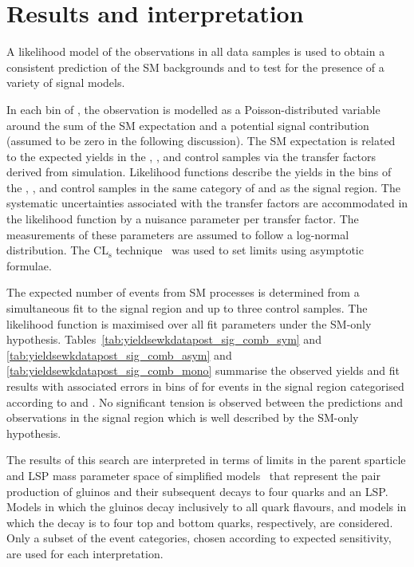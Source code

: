 \section{Results and interpretation}
\label{sec:interpretation}

A likelihood model of the observations in all data samples is
used to obtain a consistent prediction of the SM backgrounds and to
test for the presence of a variety of signal models.

In each bin of \scalht, the observation is modelled as a
Poisson-distributed variable around the sum of the SM expectation and a
potential signal contribution (assumed to be zero in the following
discussion). The SM expectation is related to the expected yields in
the \mj, \mmj, and \gj control samples via the transfer factors
derived from simulation. Likelihood functions describe the yields in the \scalht bins
of the \mj, \mmj, and \gj control samples in the same category of
\njet and \nb as the signal region. The systematic uncertainties
associated with the transfer factors are accommodated in the
likelihood function by a nuisance parameter per transfer factor. The
measurements of these parameters are assumed to follow a log-normal
distribution. The CL$_{\mathrm{s}}$ technique~\cite{read, Cowan:2010js} was used to set limits using asymptotic formulae.

The expected number of events from SM processes is determined from a
simultaneous fit to the signal region and up to three control
samples. The likelihood function is maximised over all fit parameters
under the SM-only hypothesis.
Tables~\ref{tab:yieldsewkdatapost_sig_comb_sym} and \ref{tab:yieldsewkdatapost_sig_comb_asym} and
\ref{tab:yieldsewkdatapost_sig_comb_mono} summarise
the observed yields and fit results with associated errors in bins of \scalht for events in the signal region
categorised according to \njet and \nb. 
No significant tension is observed between the predictions and observations in the
signal region which is well described by the SM-only hypothesis.




\clearpage


The results of this search are interpreted in terms of limits in the
parent sparticle and LSP mass parameter space of simplified
models~\cite{Alwall:2008ag, Alwall:2008va, sms} that represent the pair production of gluinos and their subsequent decays to four quarks 
and an LSP. Models in which the gluinos decay inclusively to all quark flavours, and models in which the decay is to four top and bottom quarks, respectively, are considered. 
Only a subset of the event categories, chosen according to expected sensitivity, are used for
each interpretation. 

